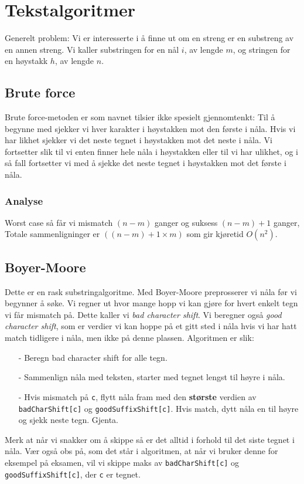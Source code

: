 \section{Tekstalgoritmer}
	Generelt problem: Vi er interesserte i å finne ut om en streng er en substreng av en annen streng. Vi kaller substringen for en nål $i$, av lengde $m$, og stringen for en høystakk $h$, av lengde $n$.

	\subsection{Brute force}
		Brute force-metoden er som navnet tilsier ikke spesielt gjennomtenkt: Til å begynne med sjekker vi hver karakter i høystakken mot den første i nåla. Hvis vi har likhet sjekker vi det neste tegnet i høystakken mot det neste i nåla. Vi fortsetter slik til vi enten finner hele nåla i høystakken eller til vi har ulikhet, og i så fall fortsetter vi med å sjekke det neste tegnet i høystakken mot det første i nåla.

	\subsubsection{Analyse}
		Worst case så får vi mismatch $(n-m)$ ganger og suksess $(n-m)+1$ ganger, Totale sammenligninger er $((n-m)+1\times m)$ som gir kjøretid $O(n^2)$.

	\subsection{Boyer-Moore}
		Dette er en rask substringalgoritme. Med Boyer-Moore preprosserer vi nåla før vi begynner å søke. Vi regner ut hvor mange hopp vi kan gjøre for hvert enkelt tegn vi får mismatch på. Dette kaller vi \textit{bad character shift}. Vi beregner også \textit{good character shift}, som er verdier vi kan hoppe på et gitt sted i nåla hvis vi har hatt match tidligere i nåla, men ikke på denne plassen. \newline Algoritmen er slik:
		\begin{itemize}
			\item[-] Beregn bad character shift for alle tegn.
			\item[-] Sammenlign nåla med teksten, starter med tegnet lengst til høyre i nåla.
			\item[-] Hvis mismatch på \verb|c|, flytt nåla fram med den \textbf{største} verdien av \verb|badCharShift[c]| og \verb|goodSuffixShift[c]|. Hvis match, dytt nåla en til høyre og sjekk neste tegn. Gjenta.
		\end{itemize}
		Merk at når vi snakker om å skippe så er det alltid i forhold til det siste tegnet i nåla. Vær også obs på, som det står i algoritmen, at når vi bruker denne for eksempel på eksamen, vil vi skippe maks av \verb|badCharShift[c]| og \verb|goodSuffixShift[c]|, der \verb|c| er tegnet.

